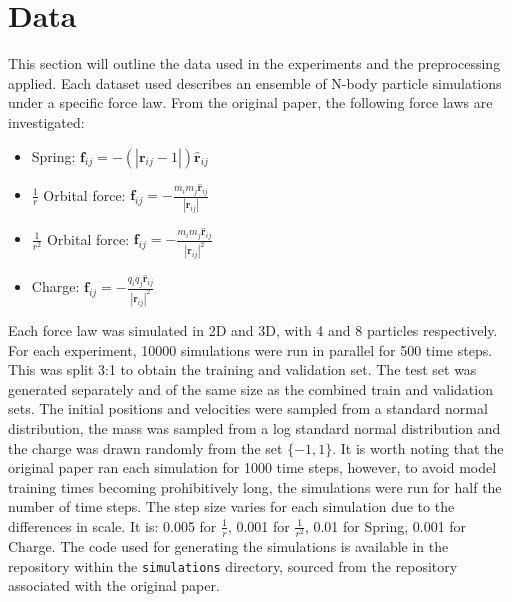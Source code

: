 \documentclass[11pt]{article}
\begin{document}
\section{Data}
This section will outline the data used in the experiments and the preprocessing applied. Each dataset used describes an ensemble of N-body particle simulations under a specific force law. From the original paper, the following force laws are investigated:
\begin{itemize}
    \item Spring: \(\textbf{f}_{ij} = -(|\textbf{r}_{ij} - 1|) \hat{\textbf{r}}_{ij}\)
    \item \(\frac{1}{r}\) Orbital force: \(\textbf{f}_{ij} = -\frac{m_i m_j\hat{\textbf{r}}_{ij}}{|\textbf{r}_{ij}|}\)
    \item \(\frac{1}{r^2}\) Orbital force: \(\textbf{f}_{ij} = -\frac{m_i m_j \hat{\textbf{r}}_{ij}}{|\textbf{r}_{ij}|^2}\)
    \item Charge: \(\textbf{f}_{ij} = -\frac{q_i q_j \hat{\textbf{r}}_{ij}}{|\textbf{r}_{ij}|^2}\)
\end{itemize}
Each force law was simulated in 2D and 3D, with 4 and 8 particles respectively. For each experiment, 10000 simulations were run in parallel for 500 time steps. This was split 3:1 to obtain the training and validation set. The test set was generated separately and of the same size as the combined train and validation sets. The initial positions and velocities were sampled from a standard normal distribution, the mass was sampled from a log standard normal distribution and the charge was drawn randomly from the set \(\{-1, 1\}\).
It is worth noting that the original paper ran each simulation for 1000 time steps, however, to avoid model training times becoming prohibitively long, the simulations were run for half the number of time steps. The step size varies for each simulation due to the differences in scale. It is: 0.005 for \( \frac{1}{r} \), 0.001 for \( \frac{1}{r^2} \), 0.01 for Spring, 0.001 for Charge. The code used for generating the simulations is available in the repository within the \texttt{simulations} directory, sourced from the repository associated with the original paper.
\end{document}
